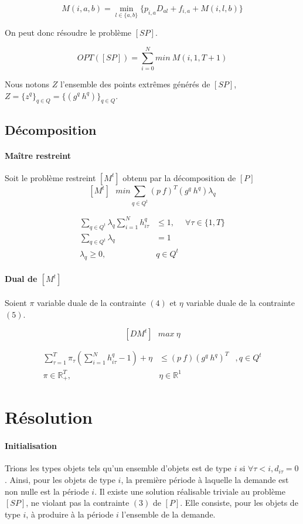 \documentclass[12pt,a4paper]{article}
\begin{document}
	 $$ M(i,a,b) =  \min_{l \in \{a,b\}} \{ p_{i,a}D_{al} + f_{i,a} + M(i,l,b) \} $$
	 
	 On peut donc résoudre le problème $[SP]$.
	 
	 $$ OPT([SP]) = \sum_{i=0}^N min~M(i,1,T+1) $$
	
	Nous notons $Z$ l'ensemble des points extrêmes générés de $[SP]$, $Z=\{z^q\}_{q\in Q} = \{ (g^q~h^q) \}_{q\in Q}$.
	
\subsection*{Décomposition}
\paragraph{Maître restreint} Soit le problème restreint $[M^t]$ obtenu par la décomposition de $[P]$
 	$$ [M^t] ~~~ min \sum_{q \in Q^t} (p~f)^T(g^q~h^q)\lambda_q $$	
 	
	\begin{eqnarray}	
 		\sum_{q \in Q^t} \lambda_q \sum_{i=1}^N h_{i\tau}^q &\leq 1, & \forall \tau \in \{1,T\} \\
 		\sum_{q \in Q^t} \lambda_q &=1 & \\
 		\lambda_q \geq 0,& q \in Q^t & \nonumber
 	\end{eqnarray}
 	
\newpage 
\paragraph{Dual de $[M^t]$} Soient $\pi$ variable duale de la contrainte $(4)$ et $\eta$ variable duale de la contrainte $(5)$.

$$ [DM^t] ~~~ max ~ \eta $$	

\begin{eqnarray}	
 		\sum_{\tau=1}^T \pi_{\tau} \left( \sum_{i=1}^N h_{i\tau}^q -1 \right) + \eta &\leq (p~f)(g^q~h^q)^T  &, q\in Q^t\\
 		\pi \in \mathbb{R}^T_+,& \eta \in \mathbb{R}^1 \nonumber
 \end{eqnarray}
 	

\section*{Résolution}	

\paragraph{Initialisation} Trions les types objets tels qu'un ensemble d'objets est de type $i$ si $\forall \tau < i , d_{i\tau} = 0$. Ainsi, pour les objets de type $i$, la première période à laquelle la demande est non nulle est la période $i$. \medbreak
 Il existe une solution réalisable triviale au problème $[SP]$, ne violant pas la contrainte $(3)$ de $[P]$. Elle consiste, pour les objets de type $i$, à produire à la période $i$ l'ensemble de la demande.
 
\end{document}
